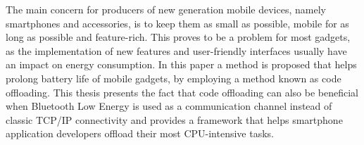 
The main concern for producers of new generation mobile devices, namely smartphones and accessories, is to keep them as small as possible, mobile for as long as possible and feature-rich. This proves to be a problem for most gadgets, as the implementation of new features and user-friendly interfaces usually have an impact on energy consumption. In this paper a method is proposed that helps prolong battery life of mobile gadgets, by employing a method known as code offloading. This thesis presents the fact that code offloading can also be beneficial when Bluetooth Low Energy is used as a communication channel instead of classic TCP/IP connectivity and provides a framework that helps smartphone application developers offload their most CPU-intensive tasks.
